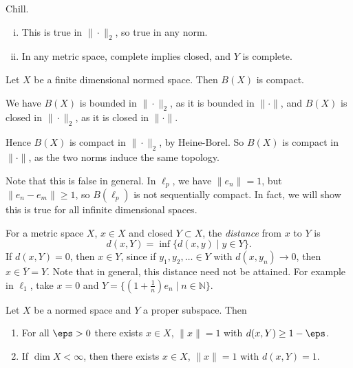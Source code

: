 \documentclass[12pt]{article}
\begin{document}
\begin{proofbox}
	Chill.
	\begin{enumerate}[(i)]
		\item This is true in $\|\cdot\|_2$, so true in any norm.
		\item In any metric space, complete implies closed, and $Y$ is complete.
	\end{enumerate}
\end{proofbox}

\begin{corollary}
	Let $X$ be a finite dimensional normed space. Then $B(X)$ is compact.
\end{corollary}

\begin{proofbox}
	We have $B(X)$ is bounded in $\|\cdot\|_2$, as it is bounded in $\|\cdot\|$, and $B(X)$ is closed in $\|\cdot\|_2$, as it is closed in $\|\cdot\|$.

	Hence $B(X)$ is compact in $\|\cdot\|_2$, by Heine-Borel. So $B(X)$ is compact in $\|\cdot\|$, as the two norms induce the same topology.
\end{proofbox}

Note that this is false in general. In $\ell_p$, we have $\|e_n\| = 1$, but $\|e_n - e_m\| \geq 1$, so $B(\ell_p)$ is not sequentially compact. In fact, we will show this is true for all infinite dimensional spaces.

For a metric space $X$, $x \in X$ and closed $Y \subset X$, the \emph{distance} from $x$ to $Y$ is
\[ 
	d(x, Y) = \inf\{d(x, y) \mid y \in Y\}.
\]
If $d(x, Y) = 0$, then $x \in Y$, since if $y_1, y_2, \ldots \in Y$ with $d(x, y_n) \to 0$, then $x \in \overline{Y} = Y$. Note that in general, this distance need not be attained. For example in $\ell_1$, take $x = 0$ and $Y = \{(1+\frac{1}{n})e_n \mid n \in \mathbb{N}\}$.

\begin{proposition}
	Let $X$ be a normed space and $Y$ a proper subspace. Then
	\begin{enumerate}[\normalfont(i)]
		\item For all $\eps > 0$ there exists $x \in X$, $\|x\|=1$ with $d(x, Y) \geq 1-\eps$.
		\item If $\dim X < \infty$, then there exists $x \in X$, $\|x\| = 1$ with $d(x, Y) = 1$.
	\end{enumerate}
\end{proposition}
\end{document}
